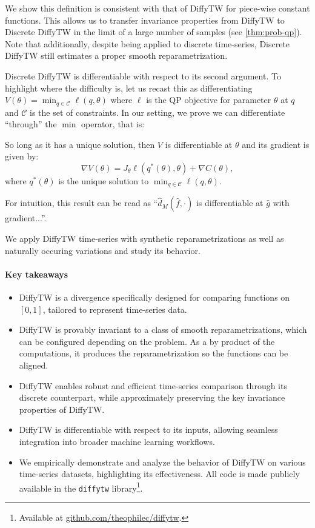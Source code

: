 We show this definition is consistent with that of DiffyTW for piece-wise constant functions. This allows us to transfer invariance properties from DiffyTW to Discrete DiffyTW in the limit of a large number of samples (see \cref{thm:prob-qp}). Note that additionally, despite being applied to discrete time-series, Discrete DiffyTW still estimates a proper smooth reparametrization. 

Discrete DiffyTW is differentiable with respect to its second argument. To highlight where the difficulty is, let us recast this as differentiating $V(\theta) = \min_{q\in\mathcal C}\ell(q, \theta)$ where $\ell$ is the QP objective for parameter $\theta$ at $q$ and $\mathcal C$ is the set of constraints. In our setting, we prove we can differentiate ``through'' the $\min$ operator, that is:
\begin{mdframed}
\begin{informaltheorem}
So long as it has a unique solution, then $V$ is differentiable at $\theta$ and its gradient is given by:
    \begin{equation}
        \nabla V(\theta) = J_\theta \ell(q^*(\theta), \theta) + \nabla C(\theta),
    \end{equation} where $q^*(\theta)$ is the unique solution to $\min_{q\in\mathcal C}\ell(q, \theta)$.
\end{informaltheorem}
\end{mdframed}
For intuition, this result can be read as ``$\hat d_M(\hat f, \cdot)$ is differentiable at $\hat g$ with gradient...''.

We apply DiffyTW time-series with synthetic reparametrizations as well as naturally occuring variations and study its behavior.

\paragraph{Key takeaways}
\begin{itemize}
    \item DiffyTW is a divergence specifically designed for comparing functions on $[0,1]$, tailored to represent time-series data.
    \item DiffyTW is provably invariant to a class of smooth reparametrizations, which can be configured depending on the problem. As a by product of the computations, it produces the reparametrization so the functions can be aligned.
    \item DiffyTW enables robust and efficient time-series comparison through its discrete counterpart, while approximately preserving the key invariance properties of DiffyTW.
    \item DiffyTW is differentiable with respect to its inputs, allowing seamless integration into broader machine learning workflows.
    \item We empirically demonstrate and analyze the behavior of DiffyTW on various time-series datasets, highlighting its effectiveness. All code is made publicly available in the \texttt{diffytw} library\footnote{Available at \url{github.com/theophilec/diffytw}.}.
\end{itemize}

